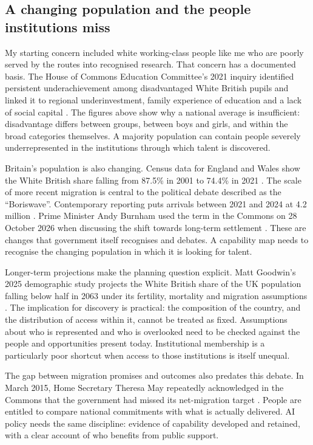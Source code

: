 \documentclass[11pt,a4paper]{article}
\begin{document}

\FloatBarrier

\subsection{A changing population and the people institutions miss}
\label{sec:population}
My starting concern included white working-class people like me who are
poorly served by the routes into recognised research. That concern has a
documented basis. The House of Commons Education Committee's 2021 inquiry
identified persistent underachievement among disadvantaged White British
pupils and linked it to regional underinvestment, family experience of
education and a lack of social capital \cite{educationcommittee2021}.
The figures above show why a national average is insufficient: disadvantage
differs between groups, between boys and girls, and within the broad
categories themselves. A majority population can contain people severely
underrepresented in the institutions through which talent is discovered.

Britain's population is also changing. Census data for England and Wales
show the White British share falling from 87.5\% in 2001 to 74.4\% in 2021
\cite{ons2021ethnicity}. The scale of more recent migration is central to
the political debate described as the ``Boriswave''. Contemporary reporting
puts arrivals between 2021 and 2024 at 4.2 million \cite{boriswave2026}.
Prime Minister Andy Burnham used the term in the Commons on 28 October
2026 when discussing the shift towards long-term settlement
\cite{hansardboriswave2026}. These are changes that government itself
recognises and debates. A capability map needs to recognise the changing
population in which it is looking for talent.

Longer-term projections make the planning question explicit. Matt Goodwin's
2025 demographic study projects the White British share of the UK population
falling below half in 2063 under its fertility, mortality and migration
assumptions \cite{goodwin2025}. The implication for discovery is practical:
the composition of the country, and the distribution of access within it,
cannot be treated as fixed. Assumptions about who is represented and who
is overlooked need to be checked against the people and opportunities
present today. Institutional membership is a particularly poor shortcut
when access to those institutions is itself unequal.

The gap between migration promises and outcomes also predates this debate.
In March 2015, Home Secretary Theresa May repeatedly acknowledged in the
Commons that the government had missed its net-migration target
\cite{hansardmigration2015}. People are entitled to compare national
commitments with what is actually delivered. AI policy needs the same
discipline: evidence of capability developed and retained, with a clear
account of who benefits from public support.
\end{document}
